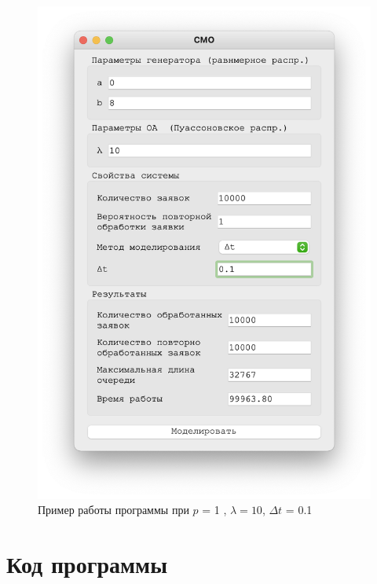  \begin{figure}[!htb]
    \begin{minipage}{0.55\textwidth}
      \centering
      \includegraphics[width=1\linewidth]{10-1-01t}
    \end{minipage}
    \caption{Пример работы программы при $p$ = 1 , $\lambda = 10$, $\Delta t$ = 0.1}
 \end{figure}





\chapter{Код программы}



